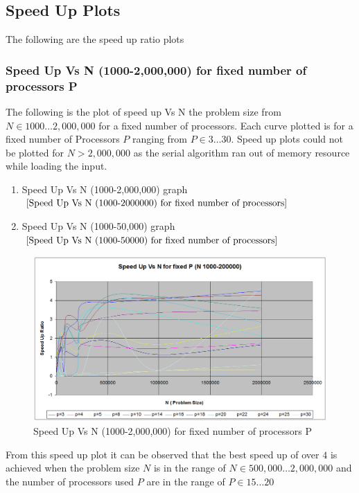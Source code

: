 \documentclass[twoside,11pt]{article}\usepackage{amsmath,amsfonts,amsthm,fullpage}
\begin{document}
\pagebreak






\subsection{Speed Up Plots}

The following are the speed up ratio plots


\subsubsection{Speed Up Vs N (1000-2,000,000) for fixed number of processors P}

The following is the plot of speed up Vs N the problem size from $N \in 1000 \dots 2,000,000$ for a fixed number of processors. Each curve plotted is for a fixed number of Processors $P$ ranging from $P \in 3 \dots 30$. Speed up plots could not be plotted for $N > 2,000,000$ as the serial algorithm ran out of memory resource while loading the input.

\begin{enumerate}
\item
Speed Up Vs N (1000-2,000,000) graph $\ref{Speed Up Vs N (1000-2000000) for fixed number of processors}$
\item
Speed Up Vs N (1000-50,000) graph $\ref{Speed Up Vs N (1000-50000) for fixed number of processors}$
\end{enumerate}

\begin{figure}[!htbp]
\centering
\includegraphics[scale=.46]{charts/p-n-speedup-1000-200000} 
\caption{Speed Up Vs N (1000-2,000,000) for fixed number of processors P}
\label{Speed Up Vs N (1000-2000000) for fixed number of processors}
\end{figure}
From this speed up plot it can be observed that the best speed up of over $4$ is achieved when the problem size $N$ is in the range of $N \in 500,000 \dots 2,000,000$ and the number of processors used $P$ are in the range of $P \in 15 \dots 20$
\pagebreak
\end{document}
